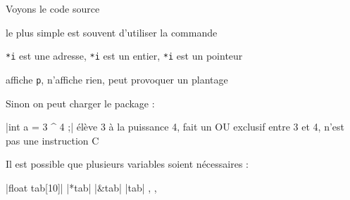 \medskip
Voyons le code source

le plus simple est souvent d'utiliser la commande 

\medskip
\begin{tkzexample}
 {{\texttt{*i} est une adresse},
 {\texttt{*i} est un entier},
 {\texttt{*i} est un pointeur}}
\end{tkzexample}

\medskip
\begin{tkzexample}
{{affiche \texttt{p}},
 {n'affiche rien},
 {peut provoquer un plantage}}
\end{tkzexample}

\medskip
Sinon on peut charger le package  :

\medskip
{}

\medskip
\begin{tkzexample}
 \verbdef\argprop|int a = 3 ^ 4 ;|
 \AQquestion{\argprop}
 {{élève 3 à la puissance 4},
  {fait un OU exclusif entre 3 et 4},
  {n'est pas une instruction C}}
\end{tkzexample}

\medskip
Il est possible que plusieurs variables soient nécessaires :

\medskip

\begin{tkzexample}
 \verbdef\arg|float tab[10]|
 \verbdef\propa|*tab|\global\let\propa\propa
 \verbdef\propb|&tab|\global\let\propb\propb
 \verbdef\propc|tab|\global\let\propc\propc
 {{\propa},
  {\propb},
  {\propc}}
\end{tkzexample}



\endinput